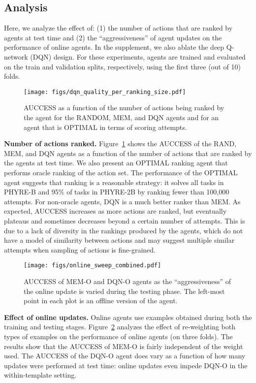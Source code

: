 \documentclass{article}
\begin{document}
\subsection{Analysis}
\label{ref:ablation}
Here, we analyze the effect of: (1) the number of actions that are ranked by agents at test time and (2) the ``aggressiveness'' of agent updates on the performance of online agents. In the supplement, we also ablate the deep Q-network (DQN) design.
For these experiments, agents are trained and evaluated on the train and validation splits, respectively, using the first three (out of 10) folds.

\begin{figure}[t]
\centering
\texttt{[image: figs/dqn\_quality\_per\_ranking\_size.pdf]}
\vspace{-2mm}
\caption{AUCCESS as a function of the number of actions being ranked by the agent for the RANDOM, MEM, and DQN agents and for an agent that is OPTIMAL in terms of scoring attempts.}
\label{fig:dqn_rerank_size}
\end{figure}

\noindent\textbf{Number of actions ranked.} Figure~\ref{fig:dqn_rerank_size} shows the AUCCESS of the RAND, MEM, and DQN agents as a function of the number of actions that are ranked by the agents at test time. We also present an OPTIMAL ranking agent that performs oracle ranking of the action set. The performance of the OPTIMAL agent suggests that ranking is a reasonable strategy: it solves all tasks in PHYRE-B and 95\% of tasks in PHYRE-2B by ranking fewer than 100,000 attempts. For non-oracle agents, DQN is a much better ranker than MEM. As expected, AUCCESS increases as more actions are ranked, but eventually plateaus and sometimes decreases beyond a certain number of attempts. This is due to a lack of diversity in the rankings produced by the agents, which do not have a model of similarity between actions and may suggest multiple similar attempts when sampling of actions is fine-grained.

\begin{figure}[t]
\centering
\texttt{[image: figs/online\_sweep\_combined.pdf]}
\vspace{-2mm}
\caption{AUCCESS of MEM-O and DQN-O agents as the ``aggressiveness'' of the online update is varied during the testing phase. The left-most point in each plot is an offline version of the agent.}
\label{fig:online_sweep}
\end{figure}

\noindent\textbf{Effect of online updates.} Online agents use examples obtained during both the training and testing stages. Figure~\ref{fig:online_sweep} analyzes the effect of re-weighting both types of examples on the performance of online agents (on three folds). The results show that the AUCCESS of MEM-O is fairly independent of the weight used. The AUCCESS of the DQN-O agent does vary as a function of how many updates were performed at test time: online updates even impede DQN-O in the within-template setting.
 
\end{document}
